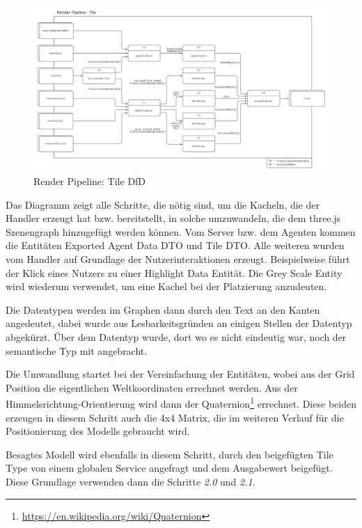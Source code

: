 \begin{figure}
    \centering
    \label{fig:render-pipeline-dfd}
    \includegraphics[scale=.65,center]{medien/render-pipeline-dfd.pdf}
    \caption{Render Pipeline: Tile DfD}
    \ownsource
\end{figure}


Das Diagramm zeigt alle Schritte, die nötig sind, um die Kacheln, die der Handler erzeugt hat bzw. bereitstellt, in solche umzuwandeln, die dem three.js Szenengraph hinzugefügt werden können.
Vom Server bzw. dem Agenten kommen die Entitäten Exported Agent Data DTO und Tile DTO.
Alle weiteren wurden vom Handler auf Grundlage der Nutzerinteraktionen erzeugt.
Beispielweise führt der Klick eines Nutzers zu einer Highlight Data Entität.
Die Grey Scale Entity wird wiederum verwendet, um eine Kachel bei der Platzierung anzudeuten.

Die Datentypen werden im Graphen dann durch den Text an den Kanten angedeutet, dabei wurde aus Lesbarkeitsgründen an einigen Stellen der Datentyp abgekürzt.
Über dem Datentyp wurde, dort wo es nicht eindeutig war, noch der semantische Typ mit angebracht.

Die Umwandlung startet bei der Vereinfachung der Entitäten, wobei aus der Grid Position die eigentlichen Weltkoordinaten errechnet werden.
Aus der Himmelsrichtung-Orientierung wird dann der Quaternion\footnote{\url{https://en.wikipedia.org/wiki/Quaternion}} errechnet.
Diese beiden erzeugen in diesem Schritt auch die 4x4 Matrix, die im weiteren Verlauf für die Positionierung des Modells gebraucht wird.

Besagtes Modell wird ebenfalls in diesem Schritt, durch den beigefügten Tile Type von einem globalen Service angefragt und dem Ausgabewert beigefügt.
Diese Grundlage verwenden dann die Schritte \textit{2.0} und \textit{2.1}.

